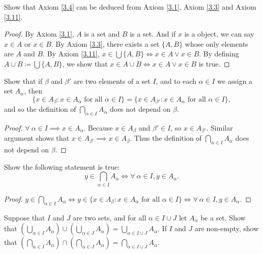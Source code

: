 \begin{exercise}\label{exercise 3.4.7}
Show that Axiom \ref{3.4} can be deduced from Axiom \ref{3.1}, Axiom \ref{3.3} and Axiom \ref{3.11}.
\end{exercise}

\begin{proof}
By Axiom \ref{3.1}, \(A\) is a set and \(B\) is a set.
And if \(x\) is a object, we can say \(x \in A\) or \(x \in B\).
By Axiom \ref{3.3}, there exists a set \(\{A, B\}\) whose only elements are \(A\) and \(B\).
By Axiom \ref{3.11}, \(x \in \bigcup \{A, B\} \iff x \in A \lor x \in B\).
By defining \(A \cup B \coloneqq \bigcup \{A, B\}\), we show that \(x \in A \cup B \iff x \in A \lor x \in B\) is true.
\end{proof}

\begin{exercise}\label{exercise 3.4.8}
Show that if \(\beta\) and \(\beta'\) are two elements of a set \(I\), and to each \(\alpha \in I\) we assign a set \(A_{\alpha}\), then
\[
    \{x \in A_{\beta} : x \in A_{\alpha} \text{ for all } \alpha \in I\} = \{x \in A_{\beta'} : x \in A_{\alpha} \text{ for all } \alpha \in I\},
\]
and so the definition of \(\bigcap_{\alpha \in I} A_{\alpha}\) does not depend on \(\beta\).
\end{exercise}

\begin{proof}
\(\forall\ \alpha \in I \implies x \in A_{\alpha}\).
Because \(x \in A_{\beta}\) and \(\beta' \in I\), so \(x \in A_{\beta'}\).
Similar argument shows that \(x \in A_{\beta'} \implies x \in A_{\beta}\).
Thus the definition of \(\bigcap_{\alpha \in I} A_{\alpha}\) does not depend on \(\beta\).
\end{proof}

\begin{exercise}\label{exercise 3.4.9}
Show the following statement is true:
\[
    y \in \bigcap_{\alpha \in I} A_{\alpha} \iff \forall\ \alpha \in I, y \in A_{\alpha}.
\]
\end{exercise}

\begin{proof}
\(y \in \bigcap_{\alpha \in I} A_{\alpha} \iff y \in \{x \in A_{\beta} : x \in A_{\alpha} \text{ for all } \alpha \in I\} \iff \forall\ \alpha \in I, y \in A_{\alpha}\).
\end{proof}

\begin{exercise}\label{exercise 3.4.10}
Suppose that \(I\) and \(J\) are two sets, and for all \(\alpha \in I \cup J\) let \(A_{\alpha}\) be a set.
Show that \((\bigcup_{\alpha \in I} A_{\alpha}) \cup (\bigcup_{\alpha \in J} A_{\alpha}) = \bigcup_{\alpha \in I \cup J} A_{\alpha}\).
If \(I\) and \(J\) are non-empty, show that \((\bigcap_{\alpha \in I} A_{\alpha}) \cap (\bigcap_{\alpha \in J} A_{\alpha}) = \bigcap_{\alpha \in I \cup J} A_{\alpha}\).
\end{exercise}

